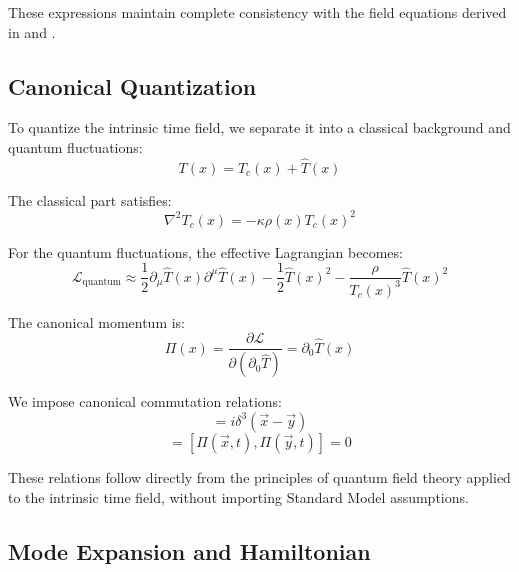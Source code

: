\documentclass[12pt,a4paper]{article}
\begin{document}
	These expressions maintain complete consistency with the field equations derived in \cite{Pascher2025Lagrange} and \cite{Pascher2025Higgs}.
	
	\subsection{Canonical Quantization}
	\label{subsec:canonical_quantization}
	
	To quantize the intrinsic time field, we separate it into a classical background and quantum fluctuations:
	\begin{equation}
		T(x) = T_c(x) + \hat{T}(x)
		\label{eq:quantum_decomposition}
	\end{equation}
	
	The classical part satisfies:
	\begin{equation}
		\nabla^2 T_c(x) = -\kappa\rho(x)T_c(x)^2
		\label{eq:classical_field_equation}
	\end{equation}
	
	For the quantum fluctuations, the effective Lagrangian becomes:
	\begin{equation}
		\mathcal{L}_{\text{quantum}} \approx \frac{1}{2}\partial_{\mu}\hat{T}(x)\partial^{\mu}\hat{T}(x) - \frac{1}{2}\hat{T}(x)^2 - \frac{\rho}{T_c(x)^3}\hat{T}(x)^2
		\label{eq:quantum_lagrangian}
	\end{equation}
	
	The canonical momentum is:
	\begin{equation}
		\Pi(x) = \frac{\partial\mathcal{L}}{\partial(\partial_0 \hat{T})} = \partial_0 \hat{T}(x)
		\label{eq:canonical_momentum}
	\end{equation}
	
	We impose canonical commutation relations:
	\begin{equation}
		[\hat{T}(\vec{x}, t), \Pi(\vec{y}, t)] = i\delta^3(\vec{x} - \vec{y})
		\label{eq:commutation_relation}
	\end{equation}
	\begin{equation}
		[\hat{T}(\vec{x}, t), \hat{T}(\vec{y}, t)] = [\Pi(\vec{x}, t), \Pi(\vec{y}, t)] = 0
		\label{eq:field_commutators}
	\end{equation}
	
	These relations follow directly from the principles of quantum field theory applied to the intrinsic time field, without importing Standard Model assumptions.
	
	\subsection{Mode Expansion and Hamiltonian}
	\label{subsec:mode_expansion}
	
\end{document}
